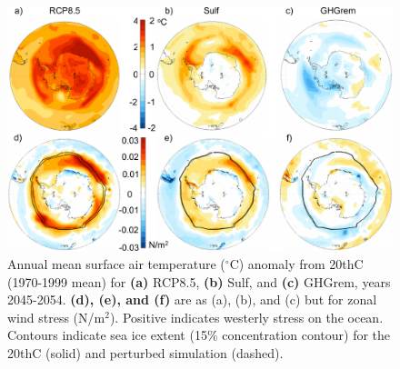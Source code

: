 \documentclass[draft,grl]{AGUTeX}  %
\begin{document}
\begin{article}
\begin{figure}[htbp] %
\centering
 \noindent\includegraphics[width=30pc]{figures/SHmaps3.pdf}
\caption{Annual mean surface air temperature ($^\circ$C) anomaly from 20thC (1970-1999 mean) for \textbf{(a)} RCP8.5, \textbf{(b)} Sulf, and \textbf{(c)} GHGrem, years 2045-2054. \textbf{(d), (e), and (f)} are as (a), (b), and (c) but for zonal wind stress (N/m$^2$). Positive indicates westerly stress on the ocean. Contours indicate sea ice extent (15\% concentration contour) for the 20thC (solid) and perturbed simulation (dashed).}
\label{fig:shmaps}
\end{figure}



\end{article}
\end{document}
